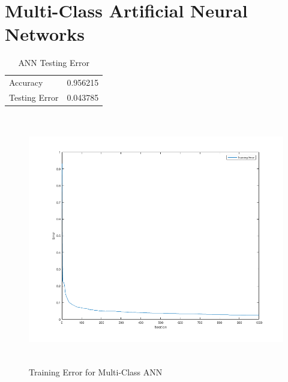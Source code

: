 \documentclass[12pt]{article}
\begin{document}
\newpage
\section{Multi-Class Artificial Neural Networks}
\begin{table}[h]
\begin{center}
\begin{tabular}{|l|l|}
\hline
Accuracy & 0.956215\\
Testing Error & 0.043785\\
\hline
\end{tabular}
\caption{ANN Testing Error}
\end{center}
\end{table}

\begin{figure}[H]
\begin{center}
\includegraphics[height=11cm]{problem3_training_error.png}
\caption{Training Error for Multi-Class ANN}
\end{center}
\end{figure}
\end{document}
